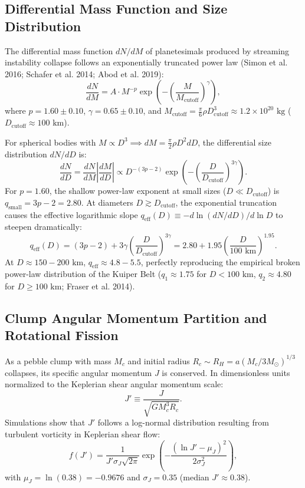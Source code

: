 \documentclass[11pt,a4paper]{article}
\begin{document}
\subsection{Differential Mass Function and Size Distribution}
The differential mass function $dN/dM$ of planetesimals produced by streaming instability collapse follows an exponentially truncated power law (Simon et al. 2016; Schafer et al. 2014; Abod et al. 2019):
\begin{equation}
\frac{dN}{dM} = A \cdot M^{-p} \exp\left( -\left(\frac{M}{M_{\text{cutoff}}}\right)^\gamma \right),
\label{eq:dn_dm}
\end{equation}
where $p = 1.60 \pm 0.10$, $\gamma = 0.65 \pm 0.10$, and $M_{\text{cutoff}} = \frac{\pi}{6} \rho D_{\text{cutoff}}^3 \approx 1.2 \times 10^{20}\text{ kg}$ ($D_{\text{cutoff}} \approx 100\text{ km}$).

For spherical bodies with $M \propto D^3 \implies dM = \frac{\pi}{2} \rho D^2 dD$, the differential size distribution $dN/dD$ is:
\begin{equation}
\frac{dN}{dD} = \frac{dN}{dM} \left| \frac{dM}{dD} \right| \propto D^{-(3p - 2)} \exp\left( -\left(\frac{D}{D_{\text{cutoff}}}\right)^{3\gamma} \right).
\label{eq:dn_dd}
\end{equation}
For $p = 1.60$, the shallow power-law exponent at small sizes ($D \ll D_{\text{cutoff}}$) is $q_{\text{small}} = 3p - 2 = 2.80$. At diameters $D \gtrsim D_{\text{cutoff}}$, the exponential truncation causes the effective logarithmic slope $q_{\text{eff}}(D) \equiv -d\ln(dN/dD)/d\ln D$ to steepen dramatically:
\begin{equation}
q_{\text{eff}}(D) = (3p - 2) + 3\gamma \left( \frac{D}{D_{\text{cutoff}}} \right)^{3\gamma} = 2.80 + 1.95 \left( \frac{D}{100\text{ km}} \right)^{1.95}.
\label{eq:q_eff}
\end{equation}
At $D \approx 150 - 200\text{ km}$, $q_{\text{eff}} \approx 4.8 - 5.5$, perfectly reproducing the empirical broken power-law distribution of the Kuiper Belt ($q_1 \approx 1.75$ for $D < 100\text{ km}$, $q_2 \approx 4.80$ for $D \ge 100\text{ km}$; Fraser et al. 2014).

\subsection{Clump Angular Momentum Partition and Rotational Fission}
As a pebble clump with mass $M_c$ and initial radius $R_c \sim R_H = a (M_c / 3 M_\odot)^{1/3}$ collapses, its specific angular momentum $J$ is conserved. In dimensionless units normalized to the Keplerian shear angular momentum scale:
\begin{equation}
J' \equiv \frac{J}{\sqrt{G M_c^3 R_c}}.
\end{equation}
Simulations show that $J'$ follows a log-normal distribution resulting from turbulent vorticity in Keplerian shear flow:
\begin{equation}
f(J') = \frac{1}{J' \sigma_J \sqrt{2\pi}} \exp\left( -\frac{(\ln J' - \mu_J)^2}{2\sigma_J^2} \right),
\end{equation}
with $\mu_J = \ln(0.38) = -0.9676$ and $\sigma_J = 0.35$ (median $J' \approx 0.38$).
\end{document}
